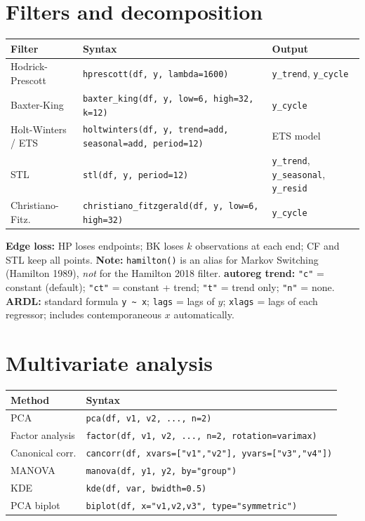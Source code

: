 \section{Filters and decomposition}

\begin{center}
\begin{tabular}{lll}
\toprule
\textbf{Filter} & \textbf{Syntax} & \textbf{Output} \\
\midrule
Hodrick-Prescott   & \texttt{hprescott(df, y, lambda=1600)}       & \texttt{y\_trend}, \texttt{y\_cycle} \\
Baxter-King        & \texttt{baxter\_king(df, y, low=6, high=32, k=12)} & \texttt{y\_cycle} \\
Holt-Winters / ETS & \texttt{holtwinters(df, y, trend=add, seasonal=add, period=12)} & ETS model \\
STL                & \texttt{stl(df, y, period=12)}               & \texttt{y\_trend}, \texttt{y\_seasonal}, \texttt{y\_resid} \\
Christiano-Fitz.   & \texttt{christiano\_fitzgerald(df, y, low=6, high=32)} & \texttt{y\_cycle} \\
\bottomrule
\end{tabular}
\end{center}

{\footnotesize \textbf{Edge loss:} HP loses endpoints; BK loses $k$ observations at each end;
CF and STL keep all points.
\textbf{Note:} \texttt{hamilton()} is an alias for Markov Switching (Hamilton 1989),
\emph{not} for the Hamilton 2018 filter.
\textbf{autoreg trend:} \texttt{"c"} = constant (default);
\texttt{"ct"} = constant + trend; \texttt{"t"} = trend only; \texttt{"n"} = none.
\textbf{ARDL:} standard formula \texttt{y \textasciitilde{} x}; \texttt{lags} = lags of $y$;
\texttt{xlags} = lags of each regressor; includes contemporaneous $x$ automatically.}

\section{Multivariate analysis}

\begin{center}
\begin{tabular}{ll}
\toprule
\textbf{Method} & \textbf{Syntax} \\
\midrule
PCA               & \texttt{pca(df, v1, v2, ..., n=2)} \\
Factor analysis   & \texttt{factor(df, v1, v2, ..., n=2, rotation=varimax)} \\
Canonical corr.   & \texttt{cancorr(df, xvars=["v1","v2"], yvars=["v3","v4"])} \\
MANOVA            & \texttt{manova(df, y1, y2, by="group")} \\
KDE               & \texttt{kde(df, var, bwidth=0.5)} \\
PCA biplot        & \texttt{biplot(df, x="v1,v2,v3", type="symmetric")} \\
\bottomrule
\end{tabular}
\end{center}

